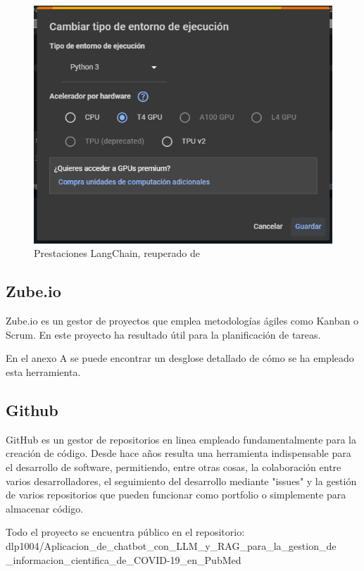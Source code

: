 \begin{figure}[h]
    \centering
    \includegraphics[width=1\textwidth]{img/aceleracion.png}
    \caption{Prestaciones LangChain, reuperado de \cite{retrieval}}
    \label{fig:acel}
\end{figure}

\subsection{Zube.io}

Zube.io es un gestor de proyectos que emplea metodologías ágiles como Kanban o Scrum. En este proyecto ha resultado útil para la planificación de tareas.

En el anexo A se puede encontrar un desglose detallado de cómo se ha empleado esta herramienta.

\subsection{Github}

GitHub es un gestor de repositorios en linea empleado fundamentalmente para la creación de código. Desde hace años resulta una herramienta indispensable para el desarrollo de software, permitiendo, entre otras cosas, la colaboración entre varios desarrolladores, el seguimiento del desarrollo mediante "issues" y la gestión de varios repositorios que pueden funcionar como portfolio o simplemente para almacenar código.

Todo el proyecto se encuentra público en el repositorio:\\
dlp1004/Aplicacion\_de\_chatbot\_con\_LLM\_y\_RAG\_para\_la\_gestion\_de\\\_informacion\_cientifica\_de\_COVID-19\_en\_PubMed

